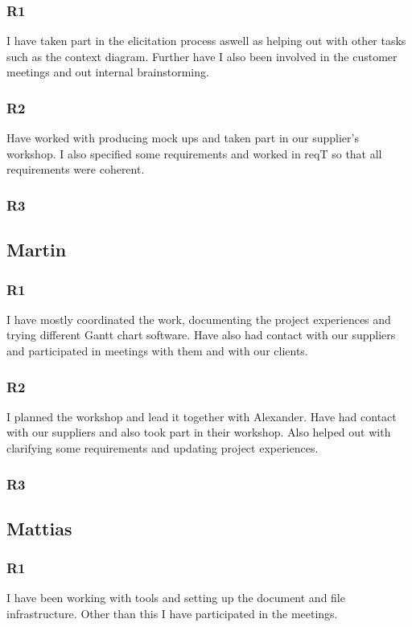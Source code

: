\documentclass[a4paper]{article}
\begin{document}
		\subsubsection{R1}
		I have taken part in the elicitation process aswell as helping out with other tasks such as the context diagram. Further have I also been involved in the customer meetings and out internal brainstorming.
		\subsubsection{R2}
		Have worked with producing mock ups and taken part in our supplier's workshop. I also specified some requirements and worked in reqT so that all requirements were coherent.
		\subsubsection{R3}
	
	\subsection{Martin}
		\subsubsection{R1}
		I have mostly coordinated the work, documenting the project experiences and trying different Gantt chart software. Have also had contact with our suppliers and participated in meetings with them and with our clients.
		\subsubsection{R2}
		I planned the workshop and lead it together with Alexander. Have had contact with our suppliers and also took part in their workshop. Also helped out with clarifying some requirements and updating project experiences.
		\subsubsection{R3}
	
	\subsection{Mattias}
		\subsubsection{R1}
		I have been working with tools and setting up the document and file infrastructure. Other than this I have participated in the meetings.
\end{document}
